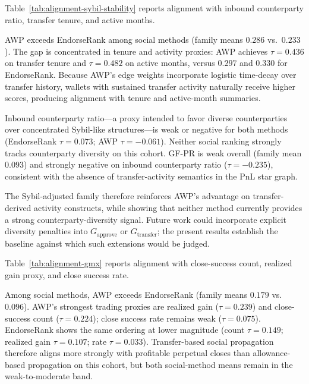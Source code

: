 
Table~\ref{tab:alignment-sybil-stability} reports alignment with inbound counterparty ratio, transfer tenure, and active months.



AWP exceeds EndorseRank among social methods (family means $0.286$ vs.\ $0.233$). The gap is concentrated in tenure and activity proxies: AWP achieves $\tau=0.436$ on transfer tenure and $\tau=0.482$ on active months, versus $0.297$ and $0.330$ for EndorseRank. Because AWP's edge weights incorporate logistic time-decay over transfer history, wallets with sustained transfer activity naturally receive higher scores, producing alignment with tenure and active-month summaries.

Inbound counterparty ratio---a proxy intended to favor diverse counterparties over concentrated Sybil-like structures---is weak or negative for both methods (EndorseRank $\tau=0.073$; AWP $\tau=-0.061$). Neither social ranking strongly tracks counterparty diversity on this cohort. GF-PR is weak overall (family mean $0.093$) and strongly negative on inbound counterparty ratio ($\tau=-0.235$), consistent with the absence of transfer-activity semantics in the PnL star graph.

The Sybil-adjusted family therefore reinforces AWP's advantage on transfer-derived activity constructs, while showing that neither method currently provides a strong counterparty-diversity signal. Future work could incorporate explicit diversity penalties into $G_{\text{approve}}$ or $G_{\text{transfer}}$; the present results establish the baseline against which such extensions would be judged.


Table~\ref{tab:alignment-gmx} reports alignment with close-success count, realized gain proxy, and close success rate.



Among social methods, AWP exceeds EndorseRank (family means $0.179$ vs.\ $0.096$). AWP's strongest trading proxies are realized gain ($\tau=0.239$) and close-success count ($\tau=0.224$); close success rate remains weak ($\tau=0.075$). EndorseRank shows the same ordering at lower magnitude (count $\tau=0.149$; realized gain $\tau=0.107$; rate $\tau=0.033$). Transfer-based social propagation therefore aligns more strongly with profitable perpetual closes than allowance-based propagation on this cohort, but both social-method means remain in the weak-to-moderate band.


